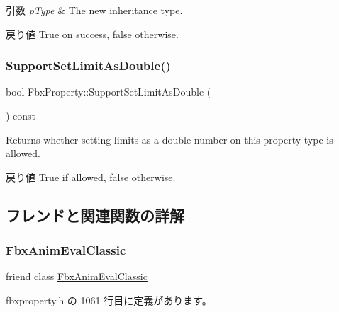 \begin{DoxyParams}{引数}
{\em p\+Type} & The new inheritance type. \\
\hline
\end{DoxyParams}
\begin{DoxyReturn}{戻り値}
{\ttfamily True} on success, {\ttfamily false} otherwise. 
\end{DoxyReturn}
\mbox{\label{class_fbx_property_a7f84a31a453f4e800e4440517418e7fe}} 
\subsubsection{\texorpdfstring{Support\+Set\+Limit\+As\+Double()}{SupportSetLimitAsDouble()}}
{\footnotesize\ttfamily bool Fbx\+Property\+::\+Support\+Set\+Limit\+As\+Double (\begin{DoxyParamCaption}{ }\end{DoxyParamCaption}) const}

Returns whether setting limits as a double number on this property type is allowed. \begin{DoxyReturn}{戻り値}
{\ttfamily True} if allowed, {\ttfamily false} otherwise. 
\end{DoxyReturn}


\subsection{フレンドと関連関数の詳解}
\mbox{\label{class_fbx_property_a1b769b6684b71dfe76f350fef1137cab}} 
\subsubsection{\texorpdfstring{Fbx\+Anim\+Eval\+Classic}{FbxAnimEvalClassic}}
{\footnotesize\ttfamily friend class \hyperlink{class_fbx_anim_eval_classic}{Fbx\+Anim\+Eval\+Classic}\hspace{0.3cm}{\ttfamily [friend]}}



 fbxproperty.\+h の 1061 行目に定義があります。

